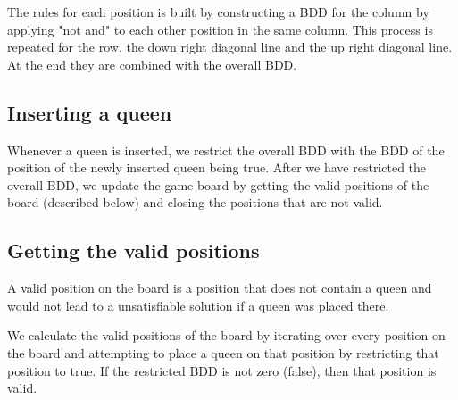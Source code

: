 The rules for each position is built by constructing a BDD for the column by applying "not and" to each other position in the same column. This process is repeated for the row, the down right diagonal line and the up right diagonal line. At the end they are combined with the overall BDD.

\subsection{Inserting a queen}
Whenever a queen is inserted, we restrict the overall BDD with the BDD of the position of the newly inserted queen being true. After we have restricted the overall BDD, we update the game board by getting the valid positions of the board (described below) and closing the positions that are not valid.

\subsection{Getting the valid positions}
A valid position on the board is a position that does not contain a queen and would not lead to a unsatisfiable solution if a queen was placed there.

We calculate the valid positions of the board by iterating over every position on the board and attempting to place a queen on that position by restricting that position to true. If the restricted BDD is not zero (false), then that position is valid.
